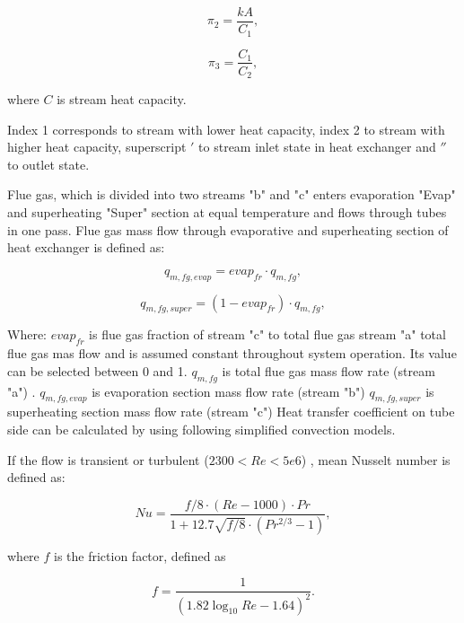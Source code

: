 \documentclass[openany]{book}
\begin{document}
	\begin{equation}\label{eq:pi_params2}
	\pi_2 = \frac{kA}{C_1},
	\end{equation}
	
	\begin{equation}\label{eq:pi_params3}
	\pi_3 = \frac{C_1}{C_2},
	\end{equation}
	
	\noindent
	where $C$ is stream heat capacity.
	
	Index 1 corresponds to stream with lower heat capacity, index 2 to stream 
	with higher heat capacity, superscript $'$ to stream inlet state in heat 
	exchanger and $''$ to outlet state.
	
	Flue gas, which is divided into two streams "b" and "c" enters evaporation 
	"Evap" and superheating "Super" section at equal temperature and flows 
	through tubes in one pass. Flue gas mass flow through evaporative and 
	superheating section of heat exchanger is defined as:
	
	\begin{equation}\label{eq:flue_gas_flow1}
	q_{m,fg,evap} = evap_{fr} \cdot q_{m,fg},
	\end{equation}
	
	\begin{equation}\label{eq:flue_gas_flow2}
	q_{m,fg,super} = (1-evap_{fr}) \cdot q_{m,fg},
	\end{equation}
	
	\noindent
	Where:
	$evap_{fr}$ is flue gas fraction of stream "c" to total flue gas stream 
	"a"  total flue gas mas flow and is assumed constant throughout system 
	operation. Its value can be selected between 0 and 1.
	$q_{m,fg}$ is total flue gas mass flow rate (stream "a") .
	$q_{m,fg,evap}$ is evaporation section mass flow rate (stream "b")
	$q_{m,fg,super}$ is superheating section mass flow rate (stream "c")
	Heat transfer coefficient on tube side can be calculated by using following 
	simplified convection models.
	
	\noindent
	If the flow is transient or turbulent ($2300 < Re < 5e6$) , mean Nusselt 
	number is defined as:
	
	\begin{equation}\label{eq:nusselt}
	Nu = \frac{f/8 \cdot (Re - 1000) \cdot Pr}{1+12.7\sqrt{f/8} \cdot 
	(Pr^{2/3}-1)},
	\end{equation}
	
	\noindent
	where $f$ is the friction factor, defined as
	
	\begin{equation}\label{eq:fric_factor}
	f = \frac{1}{(1.82\log_{10}Re - 1.64)^2}.
	\end{equation}
	
\end{document}
